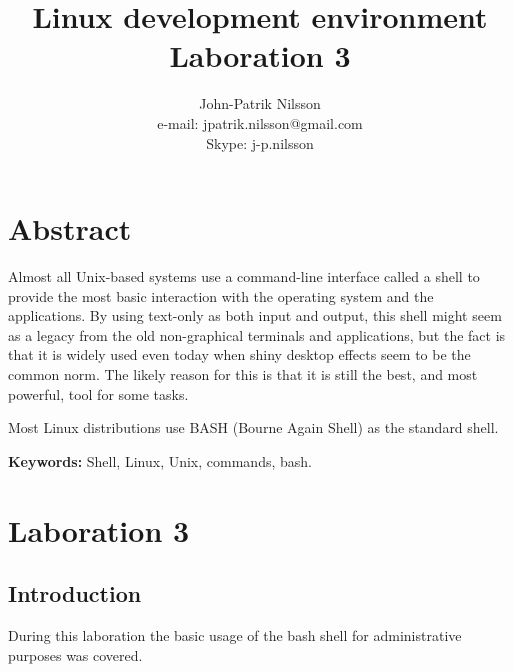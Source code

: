 \documentclass[a4paper,10pt]{article}
\title{Linux development environment \\
	Laboration 3}
\author{John-Patrik Nilsson \\
	e-mail: jpatrik.nilsson@gmail.com \\
	Skype: j-p.nilsson}
\begin{document}
\maketitle

\pagestyle{empty}
\thispagestyle{empty}

\section{Abstract}
Almost all Unix-based systems use a command-line interface called a shell to provide the most basic interaction with the operating system and the applications. By using text-only as both input and output, this shell might seem as a legacy from the old non-graphical terminals and applications, but the fact is that it is widely used even today when shiny desktop effects seem to be the common norm. The likely reason for this is that it is still the best, and most powerful, tool for some tasks.

Most Linux distributions use BASH (Bourne Again Shell) as the standard shell.

\textbf{Keywords:} Shell, Linux, Unix, commands, bash.

\section{Laboration 3}
\subsection{Introduction}
During this laboration the basic usage of the bash shell for administrative purposes was covered.
\end{document}

